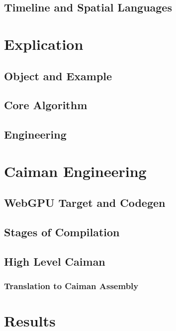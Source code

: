 \subsection{Timeline and Spatial Languages}

\section{Explication}
\label{sec:explication}

\subsection{Object and Example}

\subsection{Core Algorithm}

\subsection{Engineering}

\section{Caiman Engineering}
\label{sec:engineering}

\subsection{WebGPU Target and Codegen}

\subsection{Stages of Compilation}

\subsection{High Level Caiman}

\subsubsection{Translation to Caiman Assembly}

\section{Results}
\label{sec:results}

